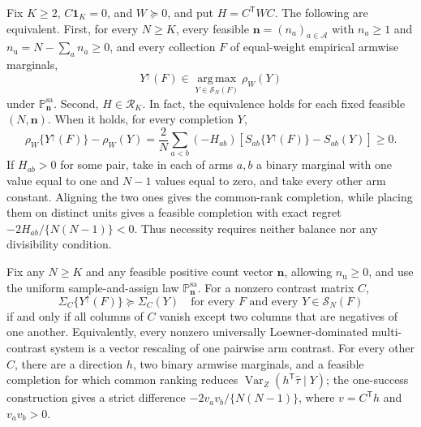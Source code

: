 Fix \(K\geq2\), \(C\mathbf 1_K=0\), and \(W\succeq0\), and put \(H=C^{\mathsf T}WC\). The following are equivalent. First, for every \(N\geq K\), every feasible \(\mathbf n=(n_a)_{a\in\mathcal A}\) with \(n_a\geq1\) and \(n_{\mathrm u}=N-\sum_a n_a\geq0\), and every collection \(F\) of equal-weight empirical armwise marginals,
\[
Y^{\uparrow}(F)\in\operatorname*{arg\,max}_{Y\in\mathcal S_N(F)}\rho_W(Y)
\]
under \(\mathbb P_{\mathbf n}^{\mathrm{sa}}\). Second, \(H\in\mathcal R_K\). In fact, the equivalence holds for each fixed feasible \((N,\mathbf n)\). When it holds, for every completion \(Y\),
\[
\rho_W\{Y^{\uparrow}(F)\}-\rho_W(Y)=\frac{2}{N}\sum_{a<b}(-H_{ab})\left[S_{ab}\{Y^{\uparrow}(F)\}-S_{ab}(Y)\right]\geq0.
\]
If \(H_{ab}>0\) for some pair, take in each of arms \(a,b\) a binary marginal with one value equal to one and \(N-1\) values equal to zero, and take every other arm constant. Aligning the two ones gives the common-rank completion, while placing them on distinct units gives a feasible completion with exact regret \(-2H_{ab}/\{N(N-1)\}<0\). Thus necessity requires neither balance nor any divisibility condition.

Fix any \(N\geq K\) and any feasible positive count vector \(\mathbf n\), allowing \(n_{\mathrm u}\geq0\), and use the uniform sample-and-assign law \(\mathbb P_{\mathbf n}^{\mathrm{sa}}\). For a nonzero contrast matrix \(C\),
\[
\Sigma_C\{Y^{\uparrow}(F)\}\succeq\Sigma_C(Y)
\quad\text{for every }F\text{ and every }Y\in\mathcal S_N(F)
\]
if and only if all columns of \(C\) vanish except two columns that are negatives of one another. Equivalently, every nonzero universally Loewner-dominated multi-contrast system is a vector rescaling of one pairwise arm contrast. For every other \(C\), there are a direction \(h\), two binary armwise marginals, and a feasible completion for which common ranking reduces \(\operatorname{Var}_Z(h^{\mathsf T}\widehat\tau\mid Y)\); the one-success construction gives a strict difference \(-2v_av_b/\{N(N-1)\}\), where \(v=C^{\mathsf T}h\) and \(v_av_b>0\).

